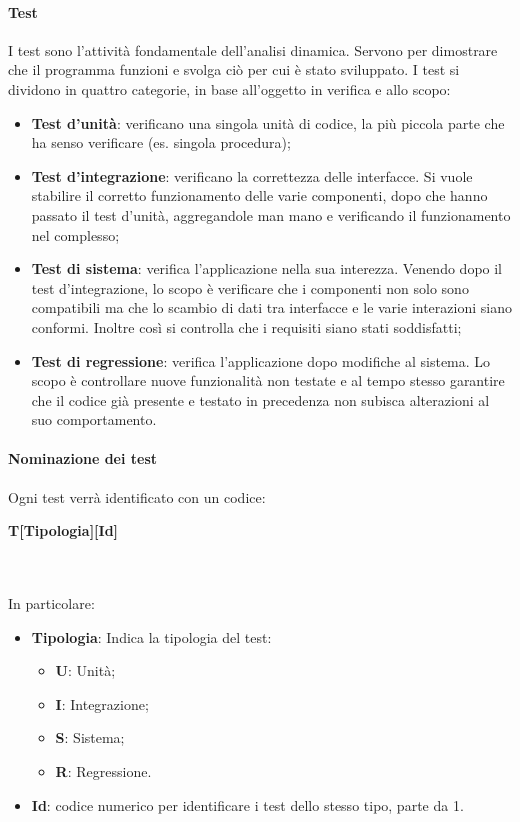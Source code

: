 \paragraph{Test}
I test sono l'attività fondamentale dell'analisi dinamica. Servono per dimostrare che il programma funzioni e svolga ciò per cui è stato sviluppato. I test si dividono in quattro categorie, in base all'oggetto in verifica e allo scopo: 
\begin{itemize}
\item \textbf{Test d'unità}: verificano una singola unità di codice, la più piccola parte che ha senso verificare (es. singola procedura);
\item \textbf{Test d'integrazione}: verificano la correttezza delle interfacce. Si vuole stabilire il corretto funzionamento delle varie componenti, dopo che hanno passato il test d'unità, aggregandole man mano e verificando il funzionamento nel complesso;
\item \textbf{Test di sistema}: verifica l'applicazione nella sua interezza. Venendo dopo il test d'integrazione, lo scopo è verificare che i componenti non solo sono compatibili ma che lo scambio di dati tra interfacce e le varie interazioni siano conformi. Inoltre così si controlla che i requisiti siano stati soddisfatti;
\item \textbf{Test di regressione}: verifica l'applicazione dopo modifiche al sistema. Lo scopo è controllare nuove funzionalità non testate e al tempo stesso garantire che il codice già presente e testato in precedenza non subisca alterazioni al suo comportamento.
\end{itemize}

\paragraph{Nominazione dei test}
Ogni test verrà identificato con un codice:
\centerline{\textbf{T[Tipologia][Id]}} \\ \\
In particolare:
\begin{itemize}
\item \textbf{Tipologia}: Indica la tipologia del test:
	\begin{itemize}
	\item \textbf{U}: Unità;
	\item \textbf{I}: Integrazione;
	\item \textbf{S}: Sistema;
	\item \textbf{R}: Regressione.
	\end{itemize}

\item \textbf{Id}: codice numerico per identificare i test dello stesso tipo, parte da 1.

\end{itemize}


